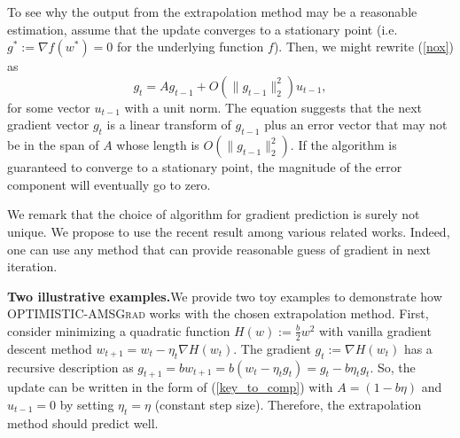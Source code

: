 \documentclass[11pt]{article}
\theoremstyle{k}
\begin{document}
To see why the output from the extrapolation method may be a reasonable estimation, assume that the update converges to
a stationary point (i.e. $g^*:=\nabla f(w^*) = 0$ for the underlying function $f$).
Then, we might rewrite (\ref{nox}) as
\begin{equation} \label{key_to_comp}
g_t = A g_{t-1}  + O( \| g_{t-1} \|_2^2 ) u_{t-1},
\end{equation}
for some vector $u_{t-1}$ with a unit norm.
The equation suggests that the next gradient vector $g_{t}$ is a linear transform of $g_{{t-1}}$
plus an error vector that may not be in the span of $A$ whose length is $O( \| g_{t-1} \|_2^2 )$.
If the algorithm is guaranteed to converge to a stationary point, the magnitude of the error component will eventually go to zero.

We remark that the choice of algorithm for gradient prediction is surely not unique. We propose to use the recent result among various related works. Indeed, one can use any method that can provide reasonable guess of gradient in next iteration.

\noindent
\textbf{Two illustrative examples.}\hspace{0.1in}We provide two toy examples to demonstrate how \textsc{OPTIMISTIC-AMSGrad} works with the chosen extrapolation method. First, consider minimizing a quadratic function $H(w) := \frac{b}{2} w^2 $  
with vanilla gradient descent method $w_{t+1} = w_t - \eta_t \nabla H(w_t)$. 
The gradient $g_{t}:= \nabla H(w_{t})$ has a recursive description as 
$g_{t+1} = b w_{t+1} = b ( w_t  - \eta_t g_t ) = g_t - b \eta_t g_t  $.
So, the update can be written in the form of (\ref{key_to_comp}) 
with $A = (1 - b \eta)$ and $u_{t-1}=0$ by setting $\eta_t=\eta$ (constant step size).
Therefore, the extrapolation method should predict well.
\end{document}
